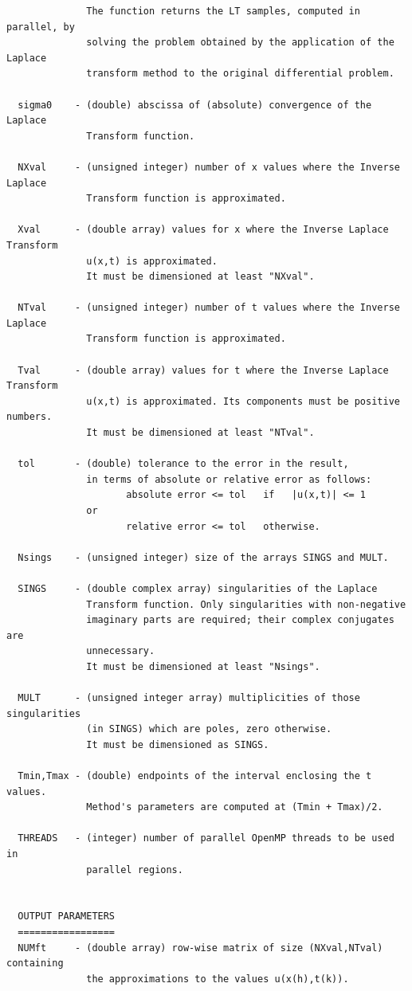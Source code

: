 \documentclass[a4paper,10pt]{report}%
\begin{document}
\begin{lstlisting}
              The function returns the LT samples, computed in parallel, by
              solving the problem obtained by the application of the Laplace
              transform method to the original differential problem.

  sigma0    - (double) abscissa of (absolute) convergence of the Laplace
              Transform function.

  NXval     - (unsigned integer) number of x values where the Inverse Laplace
              Transform function is approximated.

  Xval      - (double array) values for x where the Inverse Laplace Transform
              u(x,t) is approximated.
              It must be dimensioned at least "NXval".

  NTval     - (unsigned integer) number of t values where the Inverse Laplace
              Transform function is approximated.

  Tval      - (double array) values for t where the Inverse Laplace Transform
              u(x,t) is approximated. Its components must be positive numbers.
              It must be dimensioned at least "NTval".

  tol       - (double) tolerance to the error in the result,
              in terms of absolute or relative error as follows:
                     absolute error <= tol   if   |u(x,t)| <= 1
              or
                     relative error <= tol   otherwise.

  Nsings    - (unsigned integer) size of the arrays SINGS and MULT.

  SINGS     - (double complex array) singularities of the Laplace
              Transform function. Only singularities with non-negative
              imaginary parts are required; their complex conjugates are
              unnecessary.
              It must be dimensioned at least "Nsings".

  MULT      - (unsigned integer array) multiplicities of those singularities
              (in SINGS) which are poles, zero otherwise.
              It must be dimensioned as SINGS.

  Tmin,Tmax - (double) endpoints of the interval enclosing the t values.
              Method's parameters are computed at (Tmin + Tmax)/2.

  THREADS   - (integer) number of parallel OpenMP threads to be used in
              parallel regions.


  OUTPUT PARAMETERS
  =================
  NUMft     - (double array) row-wise matrix of size (NXval,NTval) containing
              the approximations to the values u(x(h),t(k)).


\end{lstlisting}
\end{document}
